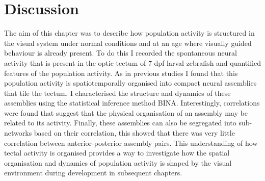 \clearpage

\section{Discussion}
The aim of this chapter was to describe how population activity is structured in the visual system under normal conditions and at an age where visually guided behaviour is already present. To do this I recorded the spontaneous neural activity that is present in the optic tectum of 7 \gls{dpf} larval zebrafish and quantified features of the population activity. As in previous studies I found that this population activity is spatiotemporally organised into compact neural assemblies that tile the tectum. I characterised the structure and dynamics of these assemblies using the statistical inference method BINA. Interestingly, correlations were found that suggest that the physical organisation of an assembly may be related to its activity. Finally, these assemblies can also be segregated into sub-networks based on their correlation, this showed that there was very little correlation between anterior-posterior assembly pairs. This understanding of how tectal activity is organised provides a way to investigate how the spatial organisation and dynamics of population activity is shaped by the visual environment during development in subsequent chapters.

